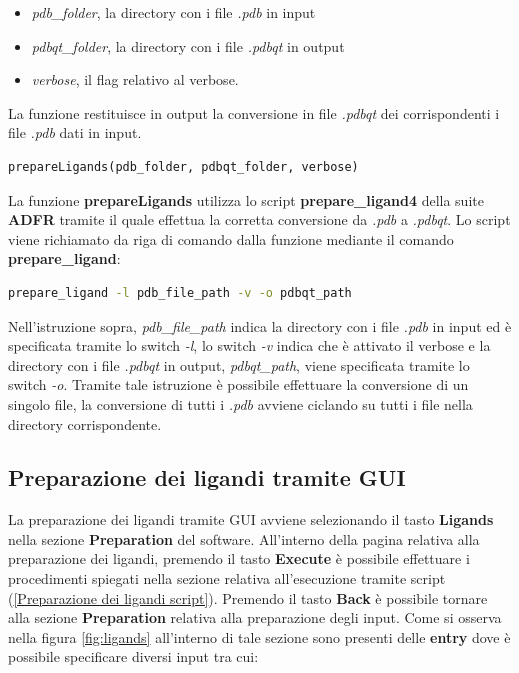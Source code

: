 \begin{itemize}
    \item \textit{pdb\_folder}, la directory con i file \textit{.pdb} in input
    \item \textit{pdbqt\_folder}, la directory con i file \textit{.pdbqt} in output
    \item \textit{verbose}, il flag relativo al verbose.
\end{itemize}

La funzione restituisce in output la conversione in file \textit{.pdbqt} dei corrispondenti i file \textit{.pdb} dati in input.

\begin{lstlisting}[language=Python, label=lst:code9,  caption={funzione prepareLigands}]
prepareLigands(pdb_folder, pdbqt_folder, verbose)
\end{lstlisting}

La funzione \textbf{prepareLigands} utilizza lo script \textbf{prepare\_ligand4} della suite \textbf{ADFR} tramite il quale effettua la corretta conversione da \textit{.pdb} a \textit{.pdbqt}. Lo script viene richiamato da riga di comando dalla funzione mediante il comando \textbf{prepare\_ligand}:

\begin{lstlisting}[language=Bash, label=lst:code10, caption={Comando per la conversione da .pdb a .pdbqt}]
prepare_ligand -l pdb_file_path -v -o pdbqt_path
\end{lstlisting}

Nell'istruzione sopra, \textit{pdb\_file\_path} indica la directory con i file \textit{.pdb} in input ed è specificata tramite lo switch \textit{-l}, lo switch \textit{-v} indica che è attivato il verbose e la directory con i file \textit{.pdbqt} in output, \textit{pdbqt\_path}, viene specificata tramite lo switch \textit{-o}. Tramite tale istruzione è possibile effettuare la conversione di un singolo file, la conversione di tutti i \textit{.pdb} avviene ciclando su tutti i file nella directory corrispondente.

\subsection{Preparazione dei ligandi tramite GUI}
La preparazione dei ligandi tramite GUI avviene selezionando il tasto \textbf{Ligands} nella sezione \textbf{Preparation} del software. All'interno della pagina relativa alla preparazione dei ligandi, premendo il tasto \textbf{Execute} è possibile effettuare i procedimenti spiegati nella sezione relativa all'esecuzione tramite script (\ref{Preparazione dei ligandi script}).\newline
Premendo il tasto \textbf{Back} è possibile tornare alla sezione \textbf{Preparation} relativa alla preparazione degli input.
Come si osserva nella figura \ref{fig:ligands} all'interno di tale sezione sono presenti delle \textbf{entry} dove è possibile specificare diversi input tra cui:

